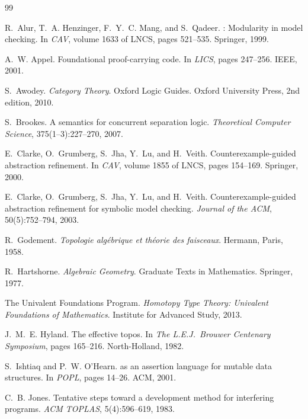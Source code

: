 \documentclass[11pt]{article}
\begin{document}
\begin{thebibliography}{99}

R.~Alur, T.~A. Henzinger, F.~Y.~C. Mang, and S.~Qadeer.
: Modularity in model checking.
\newblock In \emph{CAV}, volume 1633 of LNCS, pages 521--535. Springer, 1999.

A.~W. Appel.
\newblock Foundational proof-carrying code.
\newblock In \emph{LICS}, pages 247--256. IEEE, 2001.

S.~Awodey.
\newblock \emph{Category Theory}.
\newblock Oxford Logic Guides. Oxford University Press, 2nd edition, 2010.

S.~Brookes.
\newblock A semantics for concurrent separation logic.
\newblock \emph{Theoretical Computer Science}, 375(1--3):227--270, 2007.

E.~Clarke, O.~Grumberg, S.~Jha, Y.~Lu, and H.~Veith.
\newblock Counterexample-guided abstraction refinement.
\newblock In \emph{CAV}, volume 1855 of LNCS, pages 154--169. Springer, 2000.

E.~Clarke, O.~Grumberg, S.~Jha, Y.~Lu, and H.~Veith.
\newblock Counterexample-guided abstraction refinement for symbolic model
  checking.
\newblock \emph{Journal of the ACM}, 50(5):752--794, 2003.

R.~Godement.
\newblock \emph{Topologie alg\'{e}brique et th\'{e}orie des faisceaux}.
\newblock Hermann, Paris, 1958.

R.~Hartshorne.
\newblock \emph{Algebraic Geometry}.
\newblock Graduate Texts in Mathematics. Springer, 1977.

{The Univalent Foundations Program}.
\newblock \emph{Homotopy Type Theory: Univalent Foundations of Mathematics}.
\newblock Institute for Advanced Study, 2013.

J.~M.~E. Hyland.
\newblock The effective topos.
\newblock In \emph{The L.E.J.\ Brouwer Centenary Symposium}, pages 165--216.
  North-Holland, 1982.

S.~Ishtiaq and P.~W. O'Hearn.
 as an assertion language for mutable data structures.
\newblock In \emph{POPL}, pages 14--26. ACM, 2001.

C.~B. Jones.
\newblock Tentative steps toward a development method for interfering
  programs.
\newblock \emph{ACM TOPLAS}, 5(4):596--619, 1983.


\end{thebibliography}
\end{document}
